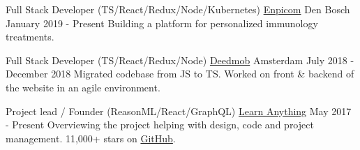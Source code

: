 
\begin{cventries}

  \cventry
    {Full Stack Developer (TS/React/Redux/Node/Kubernetes)} %
    {\href{https://www.enpicom.com}{Enpicom}} %
    {Den Bosch} %
    {January 2019 - Present} %
    {
      {Building a platform for personalized immunology treatments.}
    }

  \cventry
    {Full Stack Developer (TS/React/Redux/Node)} %
    {\href{https://www.deedmob.com}{Deedmob}} %
    {Amsterdam} %
    {July 2018 - December 2018} %
    {
      {Migrated codebase from JS to TS. Worked on front \& backend of the website in an agile environment.}
    }

  \cventry
    {Project lead / Founder (ReasonML/React/GraphQL)} %
    {\href{https://learn-anything.xyz}{Learn Anything}} %
    {} %
    {May 2017 - Present} %
    {
      {Overviewing the project helping with design, code and project management. 11,000+ stars on \href{https://github.com/learn-anything/learn-anything}{GitHub}.}
    }

\end{cventries}
